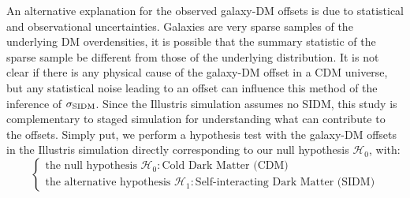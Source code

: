 An alternative explanation for the observed galaxy-DM offsets is due to 
statistical and observational uncertainties. Galaxies are very
sparse samples of the underlying DM overdensities, it is possible that the 
summary statistic of the sparse sample be different from those of the 
underlying distribution. It is not clear if there is any physical
cause of the galaxy-DM offset in a CDM universe, 
but any statistical noise leading to an offset can influence this method of 
the inference of $\sigma_{\rm SIDM}$. 
Since the Illustris simulation assumes no SIDM, this study is complementary to 
staged simulation for understanding what can contribute to the offsets.
Simply put, we perform a hypothesis test with the galaxy-DM offsets in
the Illustris simulation directly corresponding to our null hypothesis
$\mathcal{H}_0$, with: 
\begin{equation}
\begin{cases}
	\text{the null hypothesis }\mathcal{H}_0: \text{Cold Dark Matter (CDM)} \\
	\text{the alternative hypothesis }\mathcal{H}_1: \text{Self-interacting Dark
	Matter (SIDM)} 
\end{cases}
\end{equation}


